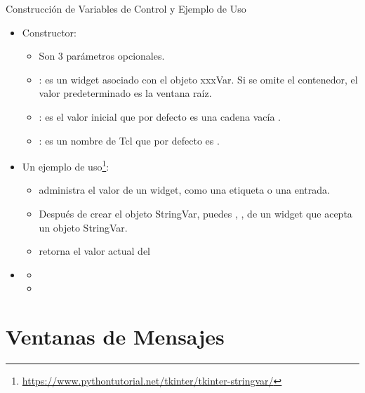 \documentclass[10pt, envcountsect , spanish]{beamer}
\begin{document}
\begin{frame}{Construcción de Variables de Control y Ejemplo de Uso}


\begin{itemize}
\item Constructor: {\small {}}

	\begin{itemize}
	\item Son 3 parámetros opcionales.
	\item {}: es un widget asociado con el objeto xxxVar. 
		Si se omite el contenedor, el valor predeterminado es la ventana raíz.
	\item {}: es el valor inicial que por defecto es una cadena vacía .
	\item {}: es un nombre de Tcl que por defecto es .
	\end{itemize}
	
\item Un ejemplo de uso\footnote{\url{https://www.pythontutorial.net/tkinter/tkinter-stringvar/}}:
	\begin{itemize}
	\item {} administra el valor de un widget, como una etiqueta o una entrada.
	\item Después de crear el objeto StringVar, puedes , , de un widget que acepta un objeto StringVar.
	\item {} retorna el valor actual del  
	\end{itemize}

\item[] \unEjemplo
	\begin{itemize}
	\item {}
	\item {}
	\end{itemize}
	
\end{itemize}
\end{frame}







\section{Ventanas de Mensajes}
\end{document}
